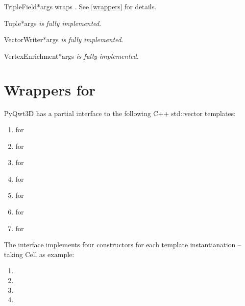 \documentclass{manual}
\newcommand{\Future}{
  \begin{notice}[warning]
    The documentation is for the future PyQwt3D-0.1 which is only available
    from CVS.
  \end{notice}
}
\renewcommand{\Future}{}
\begin{document}
\begin{classdesc}{TripleField}{*args}
wraps . See \ref{wrappers} for details.
\end{classdesc}

\begin{classdesc}{Tuple}{*args}
\emph{is fully implemented}.
\end{classdesc}

\begin{classdesc}{VectorWriter}{*args}
\emph{is fully implemented}.
\end{classdesc}

\begin{classdesc}{VertexEnrichment}{*args}
\emph{is fully implemented}.
\end{classdesc}

\section{Wrappers for  \label{wrappers}}

\Future{}

PyQwt3D has a partial interface to the following C++ std::vector templates:
\begin{enumerate}
\item
   for 
\item
   for 
\item
   for 
\item
   for 
\item
   for 
\item
   for 
\item
   for 
\end{enumerate}

The interface implements four constructors for each template instantianation --
taking Cell as example:
\begin{enumerate}
\item
\item
\item
\item
\end{enumerate}
\end{document}
